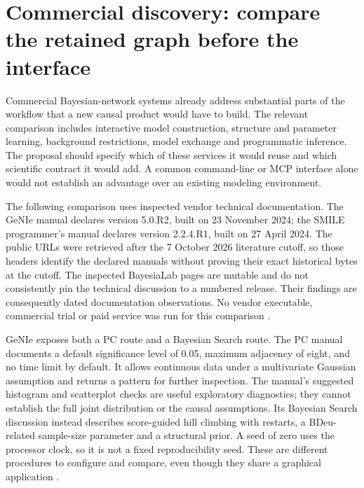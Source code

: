 \section{Commercial discovery: compare the retained graph before the interface}
\label{exec13:commercial}

Commercial Bayesian-network systems already address substantial parts of the
workflow that a new causal product would have to build. The relevant comparison
includes interactive model construction, structure and parameter learning,
background restrictions, model exchange and programmatic inference. The
proposal should specify which of these services it would reuse and which
scientific contract it would add. A common command-line or MCP interface
alone would not establish an advantage over an existing modeling environment.

The following comparison uses inspected vendor technical documentation.
The GeNIe manual declares version 5.0.R2, built on 23 November 2024; the
SMILE programmer's manual declares version 2.2.4.R1, built on 27 April 2024.
The public URLs were retrieved after the 7 October 2026 literature cutoff,
so those headers identify the declared manuals without proving their exact
historical bytes at the cutoff. The inspected BayesiaLab pages are mutable
and do not consistently pin the technical discussion to a numbered release.
Their findings are consequently dated documentation observations. No vendor
executable, commercial trial or paid service was run for this comparison
\citep{exec13_genie_readme,exec13_smile_intro,exec13_bayesia_structure}.

GeNIe exposes both a PC route and a Bayesian Search route. The PC manual
documents a default significance level of 0.05, maximum adjacency of eight,
and no time limit by default. It allows continuous data under a multivariate
Gaussian assumption and returns a pattern for further inspection. The
manual's suggested histogram and scatterplot checks are useful exploratory
diagnostics; they cannot establish the full joint distribution or the causal
assumptions. Its Bayesian Search discussion instead describes score-guided
hill climbing with restarts, a BDeu-related sample-size parameter and a
structural prior. A seed of zero uses the processor clock, so it is not a
fixed reproducibility seed. These are different procedures to configure
and compare, even though they share a graphical application
\citep{exec13_genie_pc,exec13_genie_bs}.

